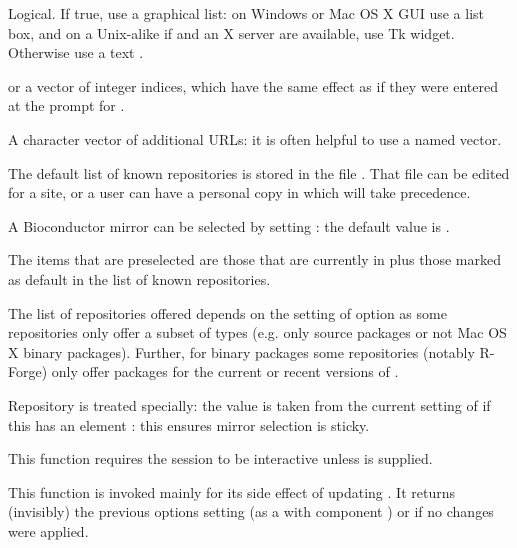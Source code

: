 \begin{Arguments}
\begin{ldescription}
\item[\code{graphics}] Logical. If true, use a graphical list: on Windows or
Mac OS X GUI use a list box, and on a Unix-alike if  and an X
server are available, use Tk widget. Otherwise use a text
.
\item[\code{ind}]  or a vector of integer indices, which have the
same effect as if they were entered at the prompt for
.
\item[\code{addURLs}] A character vector of additional URLs: it is often
helpful to use a named vector.
\end{ldescription}
\end{Arguments}
%
\begin{Details}\relax
The default list of known repositories is stored in the file
.
That file can be edited for a site, or a user can have a personal copy
in  which will take precedence.

A Bioconductor mirror can be selected by setting
: the default value is
.

The items that are preselected are those that are currently in
 plus those marked as default in the
list of known repositories.

The list of repositories offered depends on the setting of option
 as some repositories only offer a subset of types
(e.g. only source packages or not Mac OS X binary packages).
Further, for binary packages some repositories (notably R-Forge) only
offer packages for the current or recent versions of \R{}.

Repository  is treated specially: the value is taken from
the current setting of  if this has an
element : this ensures mirror selection is sticky.

This function requires the \R{} session to be interactive unless
 is supplied.
\end{Details}
%
\begin{Value}
This function is invoked mainly for its side effect of updating
.  It returns (invisibly) the previous
 options setting (as a  with component
) or  if no changes were applied.
\end{Value}
